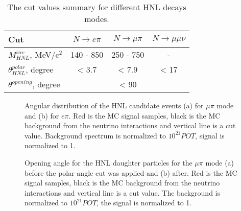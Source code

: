 \documentclass[../main.tex]{subfiles}
\begin{document}
\begin{table}[!ht]
    \centering
    \begin{tabular}{|l|c|c|c|}
    \hline
    Cut                         & $N\to e\pi$   & $N\to \mu\pi$ & $N\to\mu\mu\nu$ \\
    \hline
    \rule{0pt}{15pt}$M_{HNL}^{inv}$, MeV/c${}^2$             & 140 - 850     & 250 - 750     &      -   \\
    \hline
    \rule{0pt}{15pt}$\theta_{HNL}^{polar}$, degree      & <  3.7 & < 7.9 & < 17 \\
    \hline
    \rule{0pt}{15pt}$\theta^{opening}$, degree  & \multicolumn{3}{c|}{< 90} \\
    \hline
    \end{tabular}
    \caption{The cut values summary for different HNL decays modes.}
    \label{tbl:hnl:cuts}
\end{table}


\begin{figure}[!ht]
  \begin{minipage}[h]{0.49\linewidth}
  \end{minipage}
  \hfill
  \begin{minipage}[h]{0.49\linewidth}
  \end{minipage}
  \caption{Angular distribution of the HNL candidate events (a) for $\mu\pi$ mode and (b) for $e\pi$. Red is the MC signal samples, black is the MC background from the neutrino interactions and vertical line is a cut value. Background spectrum is normalized to $10^{21}POT$, signal is normalized to 1.}
  \label{fig:HNL:kin1}
\end{figure}

\begin{figure}[!ht]
  \begin{minipage}[h]{0.49\linewidth}
  \end{minipage}
  \hfill
  \begin{minipage}[h]{0.49\linewidth}
  \end{minipage}
  \caption{Opening angle for the HNL daughter particles for the $\mu\pi$ mode (a) before the polar angle cut was applied and (b) after. Red is the MC signal samples, black is the MC background from the neutrino interactions and vertical line is a cut value. The background is normalized to $10^{21}POT$, the signal is normalized to 1.}
  \label{fig:HNL:kin2}
\end{figure}
\end{document}
